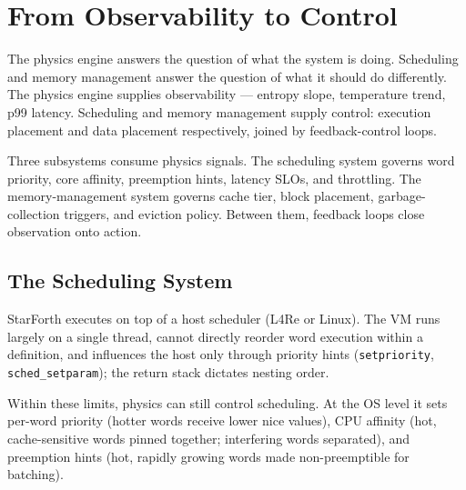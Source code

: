 
\section{From Observability to Control}

The physics engine answers the question of what the system is doing. Scheduling
and memory management answer the question of what it should do differently. The
physics engine supplies observability --- entropy slope, temperature trend, p99
latency. Scheduling and memory management supply control: execution placement and
data placement respectively, joined by feedback-control loops.

Three subsystems consume physics signals. The scheduling system governs word
priority, core affinity, preemption hints, latency SLOs, and throttling. The
memory-management system governs cache tier, block placement, garbage-collection
triggers, and eviction policy. Between them, feedback loops close observation onto
action.

\subsection{The Scheduling System}

StarForth executes on top of a host scheduler (L4Re or Linux). The VM runs
largely on a single thread, cannot directly reorder word execution within a
definition, and influences the host only through priority hints
(\texttt{setpriority}, \texttt{sched\_setparam}); the return stack dictates
nesting order.

Within these limits, physics can still control scheduling. At the OS level it sets
per-word priority (hotter words receive lower nice values), CPU affinity (hot,
cache-sensitive words pinned together; interfering words separated), and preemption
hints (hot, rapidly growing words made non-preemptible for batching).

